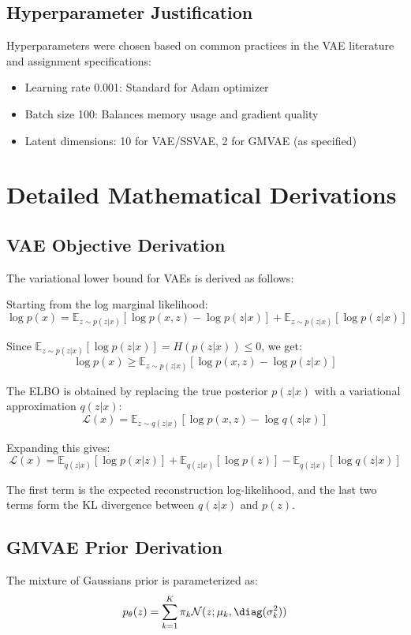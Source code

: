 \documentclass{article}
\begin{document}
\subsection{Hyperparameter Justification}
Hyperparameters were chosen based on common practices in the VAE literature and assignment specifications:
\begin{itemize}
\item Learning rate 0.001: Standard for Adam optimizer
\item Batch size 100: Balances memory usage and gradient quality
\item Latent dimensions: 10 for VAE/SSVAE, 2 for GMVAE (as specified)
\end{itemize}

\section{Detailed Mathematical Derivations}

\subsection{VAE Objective Derivation}

The variational lower bound for VAEs is derived as follows:

Starting from the log marginal likelihood:
\[
\log p(x) = \mathbb{E}_{z \sim p(z|x)} [\log p(x,z) - \log p(z|x)] + \mathbb{E}_{z \sim p(z|x)} [\log p(z|x)]
\]

Since $\mathbb{E}_{z \sim p(z|x)} [\log p(z|x)] = H(p(z|x)) \leq 0$, we get:
\[
\log p(x) \geq \mathbb{E}_{z \sim p(z|x)} [\log p(x,z) - \log p(z|x)]
\]

The ELBO is obtained by replacing the true posterior $p(z|x)$ with a variational approximation $q(z|x)$:
\[
\mathcal{L}(x) = \mathbb{E}_{z \sim q(z|x)} [\log p(x,z) - \log q(z|x)]
\]

Expanding this gives:
\[
\mathcal{L}(x) = \mathbb{E}_{q(z|x)} [\log p(x|z)] + \mathbb{E}_{q(z|x)} [\log p(z)] - \mathbb{E}_{q(z|x)} [\log q(z|x)]
\]

The first term is the expected reconstruction log-likelihood, and the last two terms form the KL divergence between $q(z|x)$ and $p(z)$.

\subsection{GMVAE Prior Derivation}

The mixture of Gaussians prior is parameterized as:
\[
p_\theta(z) = \sum_{k=1}^K \pi_k \mathcal{N}(z; \mu_k, \diag(\sigma_k^2))
\]
\end{document}

